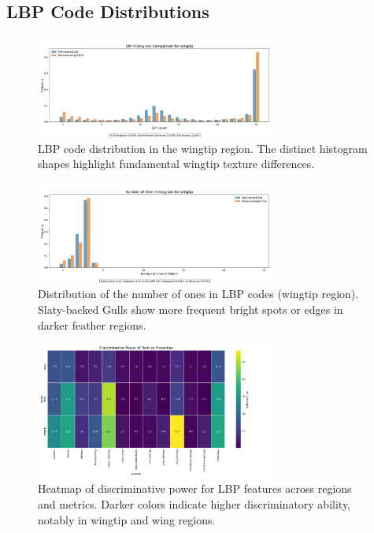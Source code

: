 \documentclass[a4paper,12pt]{report}
\begin{document}
\subsection{LBP Code Distributions}

\begin{figure}[H]
    \centering
    \includegraphics[width=0.7\textwidth]{images/Results_LBP_Analysis_Uniform/wingtip_lbp_histogram.png}
    \caption{LBP code distribution in the wingtip region. The distinct histogram shapes highlight fundamental wingtip texture differences.}
    \label{fig:lbp-wingtip}
\end{figure}

\begin{figure}[H]
    \centering
    \includegraphics[width=0.7\textwidth]{images/Results_LBP_Analysis_Uniform/wingtip_ones_histogram.png}
    \caption{Distribution of the number of ones in LBP codes (wingtip region). Slaty-backed Gulls show more frequent bright spots or edges in darker feather regions.}
    \label{fig:ones-wingtip}
\end{figure}

\begin{figure}[H]
    \centering
    \includegraphics[width=0.7\textwidth]{images/Results_LBP_Analysis_Uniform/discriminative_power_heatmap.png}
    \caption{Heatmap of discriminative power for LBP features across regions and metrics. Darker colors indicate higher discriminatory ability, notably in wingtip and wing regions.}
    \label{fig:heatmap}
\end{figure}
\end{document}
